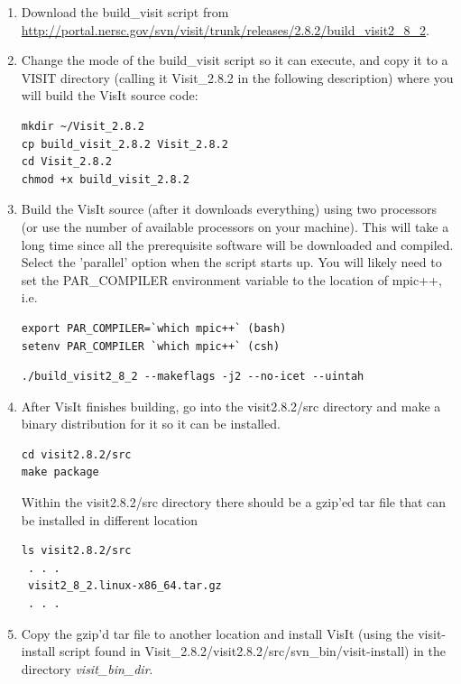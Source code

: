 \documentclass[12pt]{article}
\begin{document}
\begin{enumerate}
\item Download the build\_visit script from
  \url{http://portal.nersc.gov/svn/visit/trunk/releases/2.8.2/build_visit2_8_2}.


\item Change the mode of the build\_visit script so it can execute, and
  copy it to a VISIT directory (calling it Visit\_2.8.2 in the
  following description) where you will build the VisIt source code:
\begin{verbatim}
mkdir ~/Visit_2.8.2
cp build_visit_2.8.2 Visit_2.8.2
cd Visit_2.8.2
chmod +x build_visit_2.8.2
\end{verbatim}

\item Build the VisIt source (after it downloads everything) using two
  processors (or use the number of available processors on your
  machine). This will take a long time since all the prerequisite
  software will be downloaded and compiled. Select the 'parallel'
  option when the script starts up.  You will likely need to set the
  PAR\_COMPILER environment variable to the location of mpic++, i.e.

\begin{verbatim}
export PAR_COMPILER=`which mpic++` (bash)
setenv PAR_COMPILER `which mpic++` (csh)
\end{verbatim}

\begin{verbatim}
./build_visit2_8_2 --makeflags -j2 --no-icet --uintah
\end{verbatim}


\item After VisIt finishes building, go into the visit2.8.2/src
  directory and make a binary distribution for it so it can be
  installed.  
\begin{verbatim}
cd visit2.8.2/src
make package 
\end{verbatim}

Within the visit2.8.2/src directory there should be a gzip'ed tar
file that can be installed in different location 

\begin{verbatim}
ls visit2.8.2/src
 . . . 
 visit2_8_2.linux-x86_64.tar.gz
 . . .
\end{verbatim}

\item Copy the gzip'd tar file to another location and install VisIt
  (using the visit-install script found in
  Visit\_2.8.2/visit2.8.2/src/svn\_bin/visit-install) in the directory
  \emph{visit\_bin\_dir}.


\end{enumerate}
\end{document}
